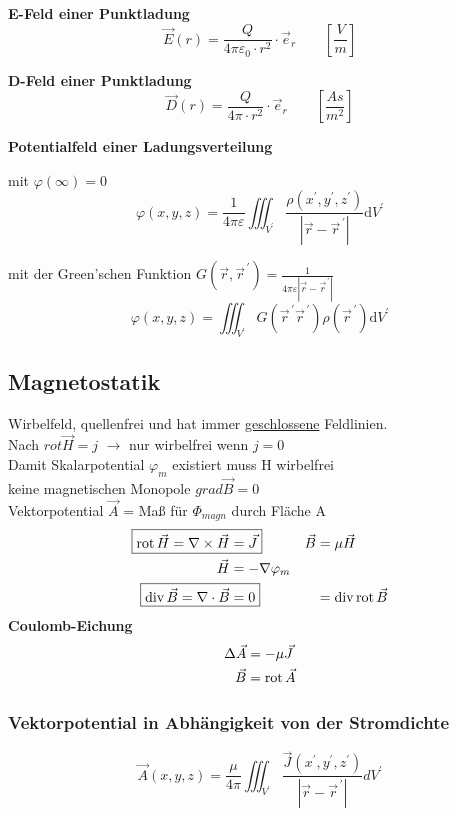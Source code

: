 \textbf{E-Feld einer Punktladung}
\[ \vec{E}(r) = \dfrac{Q}{4 \pi \varepsilon_0 \cdot r^2}\cdot\vec{e}_r \qquad\left[\frac{V}{m}\right]\] 

\textbf{D-Feld einer Punktladung}
\[ \vec{D}(r) = \dfrac{Q}{4 \pi \cdot r^2}\cdot\vec{e}_r \qquad\left[\frac{As}{m^2}\right]\]

\textbf{Potentialfeld einer Ladungsverteilung}

mit $\varphi(\infty)=0$
\[
    \varphi(x, y, z)=\frac{1}{4 \pi \varepsilon} \iiint_{V^{\prime}}
    \frac{\rho\left(x^{\prime}, y^{\prime},
        z^{\prime}\right)}{\left|\vec{r}-\vec{r}^{\,\prime}\right|} \mathrm{d}
    V^{\prime}
\]

mit der Green'schen Funktion $G\left(\vec{r}, \vec{r}^{\,\prime}\right)=\frac{1}{4 \pi \varepsilon\left|\vec{r}-\vec{r}^{\,\prime}\right|}$
\[\varphi(x, y, z)=\iiint_{V^{\prime}} G\left(\vec{r}^{\,\prime} \vec{r}^{\,\prime}\right) \rho\left(\vec{r}^{\,\prime}\right) \mathrm{d} V^{\prime}\]


\subsection{Magnetostatik}
\textbullet Wirbelfeld, quellenfrei und hat immer \underline{geschlossene} Feldlinien.\\
\textbullet Nach $rot \vec{H} = j$ $\rightarrow$ nur wirbelfrei wenn $j = 0$\\
\textbullet Damit Skalarpotential $ \varphi_m$ existiert muss H wirbelfrei\\
\textbullet keine magnetischen Monopole $grad \vec{B} = 0$\\
\textbullet Vektorpotential $ \vec{A}$ = Maß für $\Phi_{magn} $ durch Fläche A
\begin{align*}
    \Aboxed{\oprot \vec{H} = \nabla \times \vec{H} & = \vec{J} }          & \vec{B} & = \mu \vec{H}           \\
    \vec{H}                                        & = - \nabla \varphi_m &                                   \\
    \Aboxed{\opdiv \vec{B} = \nabla \cdot \vec{B}  & = 0 }                &         & = \opdiv \oprot \vec{B}
\end{align*}
\textbf{Coulomb-Eichung}
\begin{align*}
    \Delta \vec{A} & = - \mu \vec{J}  \\
    \vec{B}        & = \operatorname{rot} \vec{A}
\end{align*}

\subsubsection{Vektorpotential in Abhängigkeit von der Stromdichte}
\[
    \vec{A}(x, y, z)=\frac{\mu}{4 \pi} \iiint_{V^{\prime}} \frac{\vec{J}\left(x^{\prime}, y^{\prime}, z^{\prime}\right)}{\left|\vec{r}-\vec{r}^{\,\prime}\right|} d V^{\prime}
\]

